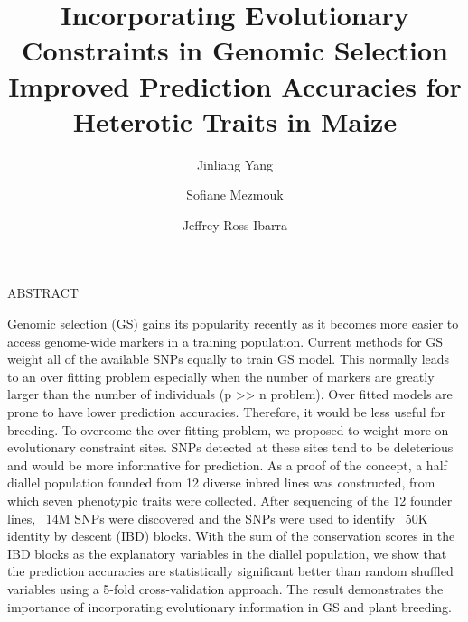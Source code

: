 \documentclass[12pt]{article}
\title{Incorporating Evolutionary Constraints in Genomic Selection Improved Prediction Accuracies for Heterotic Traits in Maize}
\date{}
\author[1]{Jinliang Yang}
\author[1,2]{Sofiane Mezmouk}
\author[1]{Jeffrey Ross-Ibarra}
\affil[1]{Department of Plant Sciences, University of California, Davis, CA 95616}
\affil[2]{Current address: Institute of sciences, Somewhere, Street of Something}
\newcommand{\smalllineskip}{\baselineskip=15pt}
\renewenvironment{abstract}[0]{\small\rm
        \begin{center}ABSTRACT
        \\ \vspace{8pt}
        \begin{minipage}{5.2in}\smalllineskip
        \hspace{1pc}}{\end{minipage}\end{center}\vspace{-1pt}}
\begin{document}
\maketitle

\begin{abstract}

Genomic selection (GS) gains its popularity recently as it becomes more easier to access genome-wide markers in a training population. Current methods for GS weight all of the available SNPs equally to train GS model. This normally leads to an over fitting problem especially when the number of markers are greatly larger than the number of individuals (p >> n problem). Over fitted models are prone to have lower prediction accuracies. Therefore, it would be less useful for breeding. To overcome the over fitting problem, we proposed to weight more on evolutionary constraint sites. SNPs detected at these sites tend to be deleterious and would be more informative for prediction. As a proof of the concept, a half diallel population founded from 12 diverse inbred lines was constructed, from which seven phenotypic traits were collected. After sequencing of the 12 founder lines, ~14M SNPs were discovered and the SNPs were used to identify ~50K identity by descent (IBD) blocks. With the sum of the conservation scores in the IBD blocks as the explanatory variables in the diallel population, we show that the prediction accuracies are statistically significant better than random shuffled variables using a 5-fold cross-validation approach. The result demonstrates the importance of incorporating evolutionary information in GS and plant breeding.

\end{abstract}
\end{document}
